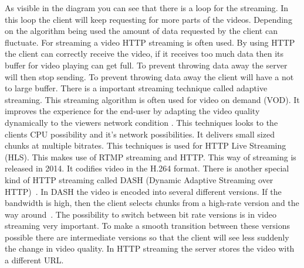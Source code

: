 \documentclass{sig-alternate-br}
\begin{document}
As visible in the diagram you can see that there is a loop for the streaming. In this loop the client will keep requesting for more parts of the videos. Depending on the algorithm being used the amount of data requested by the client can fluctuate. For streaming a video HTTP streaming is often used. By using HTTP the client can correctly receive the video, if it receives too much data then its buffer for video playing can get full. To prevent throwing data away the server will then stop sending. To prevent throwing data away the client will have a not to large buffer. \newline
There is a important streaming technique called adaptive streaming. This streaming algorithm is often used for video on demand (VOD). It improves the experience for the end-user by adapting the video quality dynamically to the viewers network condition \cite{ffmpeg}. This techniques looks to the clients CPU possibility and it's network possibilities. It delivers small sized chunks at multiple bitrates. This techniques is used for HTTP Live Streaming (HLS). This makes use of RTMP streaming and HTTP. This way of streaming is released in 2014. It codifies video in the H.264 format.\newline
There is another special kind of HTTP streaming called DASH (Dynamic Adaptive Streaming over HTTP)~\cite{computer-networking}. In DASH the video is encoded into several different versions. If the bandwidth is high, then the client selects chunks from a high-rate version and the way around~\cite{computer-networking}. The possibility to switch between bit rate versions is in video streaming very important. To make a smooth transition between these versions possible there are intermediate versions so that the client will see less suddenly the change in video quality. In HTTP streaming the server stores the video with a different URL.   
\end{document}
